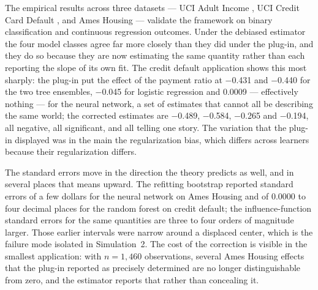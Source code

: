 \documentclass[12pt]{article}
\begin{document}
	The empirical results across three datasets --- UCI Adult Income \citep{kohavi1996,
		UCI}, UCI Credit Card Default \citep{yeh2009, UCI}, and Ames Housing
	\citep{decock2011} --- validate the framework on binary classification and continuous
	regression outcomes. Under the debiased estimator the four model classes agree far
	more closely than they did under the plug-in, and they do so because they are now
	estimating the same quantity rather than each reporting the slope of its own fit.
	The credit default application shows this most sharply: the plug-in put the effect
	of the payment ratio at $-$0.431 and $-$0.440 for the two tree ensembles, $-$0.045
	for logistic regression and 0.0009 --- effectively nothing --- for the neural
	network, a set of estimates that cannot all be describing the same world; the
	corrected estimates are $-$0.489, $-$0.584, $-$0.265 and $-$0.194, all negative,
	all significant, and all telling one story. The variation that the plug-in
	displayed was in the main the regularization bias, which differs across learners
	because their regularization differs.

	The standard errors move in the direction the theory predicts as well, and in
	several places that means upward. The refitting bootstrap reported standard errors
	of a few dollars for the neural network on Ames Housing and of 0.0000 to four
	decimal places for the random forest on credit default; the influence-function
	standard errors for the same quantities are three to four orders of magnitude
	larger. Those earlier intervals were narrow around a displaced center, which is the
	failure mode isolated in Simulation~2. The cost of the correction is visible in the
	smallest application: with $n = 1{,}460$ observations, several Ames Housing effects
	that the plug-in reported as precisely determined are no longer distinguishable
	from zero, and the estimator reports that rather than concealing it.
\end{document}
